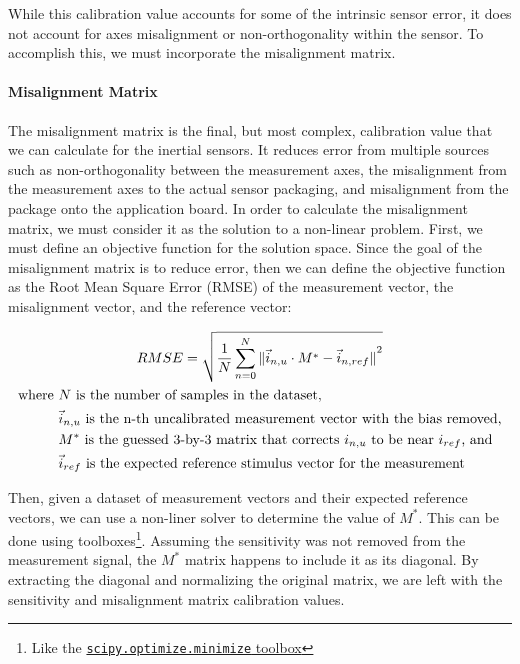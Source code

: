 While this calibration value accounts for some of the intrinsic sensor error, it does not account for axes misalignment or non-orthogonality within the sensor. To accomplish this, we must incorporate the misalignment matrix.

\paragraph*{Misalignment Matrix} The misalignment matrix is the final, but most complex, calibration value that we can calculate for the inertial sensors. It reduces error from multiple sources such as non-orthogonality between the measurement axes, the misalignment from the measurement axes to the actual sensor packaging, and misalignment from the package onto the application board. In order to calculate the misalignment matrix, we must consider it as the solution to a non-linear problem. First, we must define an objective function for the solution space. Since the goal of the misalignment matrix is to reduce error, then we can define the objective function as the Root Mean Square Error (RMSE) of the measurement vector, the misalignment vector, and the reference vector:

\begin{gather} \labeq{misalignment_obj_func}
    RMSE = \sqrt{\frac{1}{N}\sum_{n=0}^N{\|{\vec{i}_{n,u} \cdot M^* -\vec{i}_{n,ref}\|}^2}} \\
    \begin{aligned}
        \text{where } & N \text{ is the number of samples in the dataset,} \\
        & \vec{i}_{n,u} \text{ is the n-th uncalibrated measurement vector with the bias removed,} \\
        & M^* \text{ is the guessed 3-by-3 matrix that corrects $i_{n,u}$ to be near $i_{ref}$, and } \\
        & \vec{i}_{ref} \text{ is the expected reference stimulus vector for the measurement}
    \end{aligned} \notag
\end{gather}

Then, given a dataset of measurement vectors and their expected reference vectors, we can use a non-liner solver to determine the value of $M^*$. This can be done using toolboxes\footnote{Like the \href{https://docs.scipy.org/doc/scipy/reference/generated/scipy.optimize.minimize.html}{\lstinline{scipy.optimize.minimize} toolbox}}. 
Assuming the sensitivity was not removed from the measurement signal, the $M^*$ matrix happens to include it as its diagonal. 
By extracting the diagonal and normalizing the original matrix, we are left with the sensitivity and misalignment matrix calibration values.

